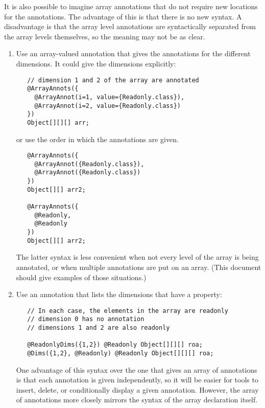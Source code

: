 It is also possible to imagine array annotations that do not require new
locations for the annotations.  The advantage of this is that there is no
new syntax.  A disadvantage is that the array level annotations are
syntactically separated from the array levels themselves, so the meaning
may not be as clear.

\begin{enumerate}
\setcounter{enumi}{\thesaveenumi}
\item Use an array-valued annotation that gives the annotations for the
  different dimensions.  It could give the dimensions explicitly:
\begin{Verbatim}
   // dimension 1 and 2 of the array are annotated
   @ArrayAnnots({
     @ArrayAnnot(i=1, value={Readonly.class}),
     @ArrayAnnot(i=2, value={Readonly.class})
   })
   Object[][][] arr;
\end{Verbatim}
or use the order in which the annotations are given.
\begin{Verbatim}
   @ArrayAnnots({
     @ArrayAnnot({Readonly.class}),
     @ArrayAnnot({Readonly.class})
   })
   Object[][] arr2;

   @ArrayAnnots({
     @Readonly,
     @Readonly
   })
   Object[][] arr2;
\end{Verbatim}
The latter syntax is less convenient when not every level of the array is
being annotated, or when multiple annotations are put on an array.
(This document should give examples of those situations.)

\item
Use an annotation that lists the dimensions that have a property:
\begin{Verbatim}
   // In each case, the elements in the array are readonly
   // dimension 0 has no annotation
   // dimensions 1 and 2 are also readonly

   @ReadonlyDims({1,2}) @Readonly Object[][][] roa;
   @Dims({1,2}, @Readonly) @Readonly Object[][][] roa;
\end{Verbatim}
One advantage of this syntax over the one that gives an array of
annotations is that each annotation is given independently, so it will be
easier for tools to insert, delete, or conditionally display a given
annotation.  However, the array of annotations more closely mirrors the
syntax of the array declaration itself.

\end{enumerate}


